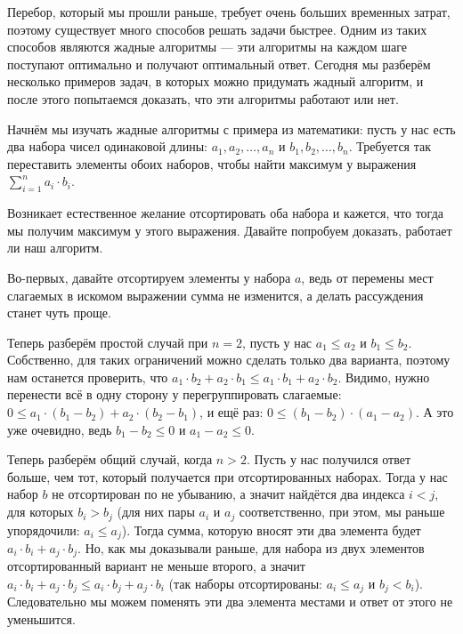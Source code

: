 Перебор, который мы прошли раньше, требует очень больших временных затрат, поэтому существует много способов решать задачи быстрее. Одним из таких способов являются жадные алгоритмы — эти алгоритмы на каждом шаге поступают оптимально и получают оптимальный ответ. Сегодня мы разберём несколько примеров задач, в которых можно придумать жадный алгоритм, и после этого попытаемся доказать, что эти алгоритмы работают или нет.


Начнём мы изучать жадные алгоритмы с примера из математики: пусть у нас есть два набора чисел одинаковой длины: $a_1, a_2, \ldots, a_n$ и $b_1, b_2, \ldots, b_n$. Требуется так переставить элементы обоих наборов, чтобы найти максимум у выражения $\sum\limits_{i = 1}^{n} a_i \cdot b_i$.

Возникает естественное желание отсортировать оба набора и кажется, что тогда мы получим максимум у этого выражения. Давайте попробуем доказать, работает ли наш алгоритм.

Во-первых, давайте отсортируем элементы у набора $a$, ведь от перемены мест слагаемых в искомом выражении сумма не изменится, а делать рассуждения станет чуть проще.

Теперь разберём простой случай при $n=2$, пусть у нас $a_1 \leq a_2$ и $b_1 \leq b_2$. Собственно, для таких ограничений можно сделать только два варианта, поэтому нам останется проверить, что $a_1 \cdot b_2 + a_2 \cdot b_1 \leq a_1 \cdot b_1 + a_2 \cdot b_2$. Видимо, нужно перенести всё в одну сторону у перегруппировать слагаемые: $0 \leq a_1 \cdot (b_1 - b_2) + a_2 \cdot (b_2 - b_1)$, и ещё раз: $0 \leq (b_1 - b_2) \cdot (a_1 - a_2)$. А это уже очевидно, ведь $b_1 - b_2 \leq 0$ и $a_1 - a_2 \leq 0$.

Теперь разберём общий случай, когда $n>2$. Пусть у нас получился ответ больше, чем тот, который получается при отсортированных наборах. Тогда у нас набор $b$ не отсортирован по не убыванию, а значит найдётся два индекса $i < j$, для которых $b_i > b_j$ (для них пары $a_i$ и $a_j$ соответственно, при этом, мы раньше упорядочили: $a_i \leq a_j$). Тогда сумма, которую вносят эти два элемента будет $a_i \cdot b_i + a_j \cdot b_j$. Но, как мы доказывали раньше, для набора из двух элементов отсортированный вариант не меньше второго, а значит $a_i \cdot b_i + a_j \cdot b_j \leq a_i \cdot b_j + a_j \cdot b_i$ (так наборы отсортированы: $a_i \leq a_j$ и $b_j < b_i$). Следовательно мы можем поменять эти два элемента местами и ответ от этого не уменьшится.

